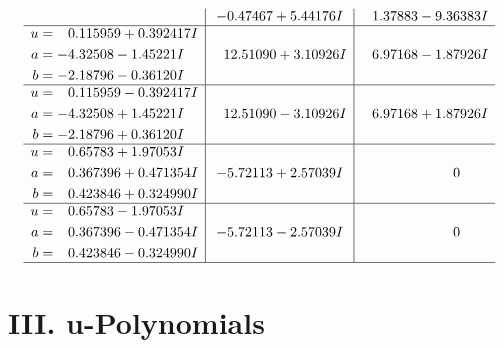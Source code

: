 \documentclass[1p]{elsarticle_modified}
\theoremstyle{definition}
\begin{document}
$$\begin{array}{c|c|c}
 & -0.47467 + 5.44176 I & \phantom{-}1.37883 - 9.36383 I \\ \hline\begin{aligned}
u &= \phantom{-}0.115959 + 0.392417 I \\
a &= -4.32508 - 1.45221 I \\
b &= -2.18796 - 0.36120 I\end{aligned}
 & \phantom{-}12.51090 + 3.10926 I & \phantom{-}6.97168 - 1.87926 I \\ \hline\begin{aligned}
u &= \phantom{-}0.115959 - 0.392417 I \\
a &= -4.32508 + 1.45221 I \\
b &= -2.18796 + 0.36120 I\end{aligned}
 & \phantom{-}12.51090 - 3.10926 I & \phantom{-}6.97168 + 1.87926 I \\ \hline\begin{aligned}
u &= \phantom{-}0.65783 + 1.97053 I \\
a &= \phantom{-}0.367396 + 0.471354 I \\
b &= \phantom{-}0.423846 + 0.324990 I\end{aligned}
 & -5.72113 + 2.57039 I & \phantom{-0.000000 } 0 \\ \hline\begin{aligned}
u &= \phantom{-}0.65783 - 1.97053 I \\
a &= \phantom{-}0.367396 - 0.471354 I \\
b &= \phantom{-}0.423846 - 0.324990 I\end{aligned}
 & -5.72113 - 2.57039 I & \phantom{-0.000000 } 0\\
 \hline 
 \end{array}$$\newpage
\newpage\renewcommand{\arraystretch}{1}
\centering \section*{ III. u-Polynomials}
\end{document}
